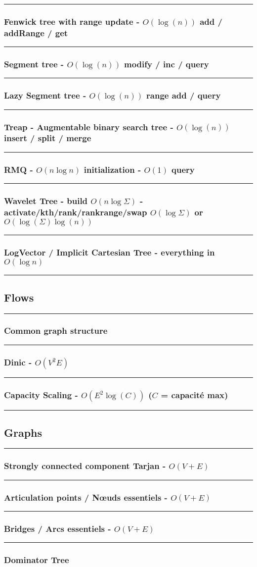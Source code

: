 \documentclass[landscape,a4paper,twocolumn,10pt]{report}
\renewcommand{\line}{\noindent\rule{\linewidth}{1pt}}
\newcommand{\algosection}[1]{\line \subsection*{#1}}
\newcommand{\algorithm}[1]{\line \subsubsection*{#1}}
\begin{document}
\algorithm{Fenwick tree with range update - $O(\log(n))$ add / addRange / get}


\algorithm{Segment tree - $O(\log(n))$ modify / inc / query}


\algorithm{Lazy Segment tree - $O(\log(n))$ range add / query}


\algorithm{Treap - Augmentable binary search tree - $O(\log(n))$ insert / split / merge}


%

\algorithm{RMQ - $O(n \log n)$ initialization - $O(1)$ query}


\algorithm{Wavelet Tree - build $O(n \log \Sigma)$ - activate/kth/rank/rankrange/swap $O(\log \Sigma)$ or $O(\log(\Sigma) \log(n))$}


\algorithm{LogVector / Implicit Cartesian Tree - everything in $O(\log n)$}


\algosection{Flows}
\label{flows}

\algorithm{Common graph structure}


\algorithm{Dinic - $O(V^2 E)$}


\algorithm{Capacity Scaling - $O(E^2 \log(C))$ ($C$ = capacité max)}




\algosection{Graphs}
\label{graphs}

\algorithm{Strongly connected component Tarjan - $O(V + E)$}


%

\algorithm{Articulation points / N\oe uds essentiels - $O(V + E)$}


\algorithm{Bridges / Arcs essentiels - $O(V + E)$}


\algorithm{Dominator Tree}

\end{document}
